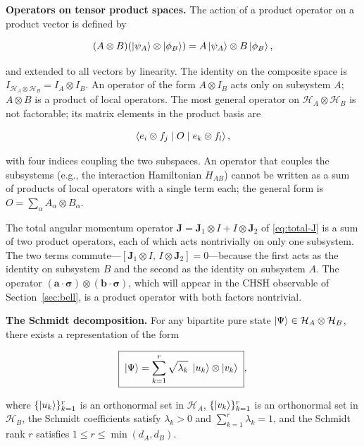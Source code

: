 \medskip\noindent\textbf{Operators on tensor product spaces.}
The action of a product operator on a product vector is defined by
\begin{linenomath}
\begin{equation}
(A \otimes B)(\ket{\psi_A} \otimes \ket{\phi_B})
= A\ket{\psi_A} \otimes B\ket{\phi_B},
\label{eq:tensor-operator}
\end{equation}
\end{linenomath}
and extended to all vectors by linearity. The identity on the composite space is $I_{\mathcal{H}_A \otimes \mathcal{H}_B} = I_A \otimes I_B$. An operator of the form $A \otimes I_B$ acts only on subsystem $A$; $A \otimes B$ is a product of local operators. The most general operator on $\mathcal{H}_A \otimes \mathcal{H}_B$ is not factorable; its matrix elements in the product basis are
\begin{linenomath}
\begin{equation}
\braket{e_i \otimes f_j \mid O \mid e_k \otimes f_l},
\label{eq:tensor-operator-general}
\end{equation}
\end{linenomath}
with four indices coupling the two subspaces. An operator that couples the subsystems (e.g., the interaction Hamiltonian $H_{AB}$) cannot be written as a sum of products of local operators with a single term each; the general form is $O = \sum_{\alpha} A_\alpha \otimes B_\alpha$.

\begin{note}
The total angular momentum operator $\bm J = \bm J_1 \otimes I + I \otimes \bm J_2$ of \eqref{eq:total-J} is a sum of two product operators, each of which acts nontrivially on only one subsystem. The two terms commute---$[\bm J_1 \otimes I,\, I \otimes \bm J_2] = 0$---because the first acts as the identity on subsystem $B$ and the second as the identity on subsystem $A$. The operator $(\bm a \cdot \bm \sigma) \otimes (\bm b \cdot \bm \sigma)$, which will appear in the CHSH observable of Section~\ref{sec:bell}, is a product operator with both factors nontrivial.
\end{note}

\medskip\noindent\textbf{The Schmidt decomposition.}
For any bipartite pure state $\ket{\Psi} \in \mathcal{H}_A \otimes \mathcal{H}_B$, there exists a representation of the form
\begin{linenomath}
\begin{equation}
\boxed{\;
\ket{\Psi} = \sum_{k=1}^{r} \sqrt{\lambda_k}\;\ket{u_k} \otimes \ket{v_k}
\;},
\label{eq:schmidt-decomposition}
\end{equation}
\end{linenomath}
where $\{\ket{u_k}\}_{k=1}^{r}$ is an orthonormal set in $\mathcal{H}_A$, $\{\ket{v_k}\}_{k=1}^{r}$ is an orthonormal set in $\mathcal{H}_B$, the Schmidt coefficients satisfy $\lambda_k > 0$ and $\sum_{k=1}^{r} \lambda_k = 1$, and the Schmidt rank $r$ satisfies $1 \le r \le \min(d_A, d_B)$.


